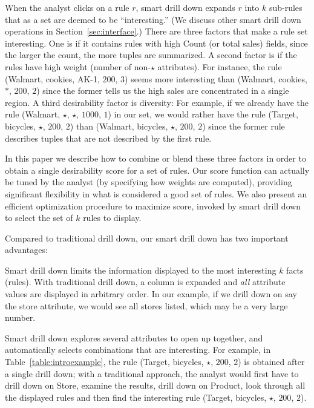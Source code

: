 \begin{example}
When the analyst clicks on a rule $r$, smart drill down
expands $r$ into $k$ sub-rules that as a set are deemed to be ``interesting.''
(We discuss other smart drill down operations in Section~\ref{sec:interface}.)
There are three factors that make a rule set interesting.
One is if it contains rules with high Count (or total sales) fields,
since the larger the count, the more tuples are summarized.
A second factor is if the rules have high weight (number of non-$\star$ attributes).
For instance, the rule (Walmart, cookies, AK-1, $200$, $3$)
seems more interesting than (Walmart, cookies, $*$, $200$, $2$)
since the former tells us the high sales are concentrated in a single region.
A third desirability factor is diversity:
For example, if we already have the rule (Walmart, $\star$, $\star$, $1000$, $1$)
in our set, we would rather have the rule (Target, bicycles, $\star$, $200$, $2$)
than (Walmart, bicycles, $\star$, $200$, $2$) since the former rule
describes tuples that are not described by the first rule.
\end{example}

In this paper we describe how to combine or blend these three factors
in order to obtain a single desirability score for a set of rules.
Our score function can actually be tuned by the analyst
(by specifying how weights are computed),
providing significant flexibility in what is considered a good set of rules.
We also present an efficient optimization procedure to maximize score, invoked
by smart drill down to select the set of $k$ rules to display.


 Compared to traditional drill down, our smart drill down has two important advantages:
\squishlist
\item
Smart drill down limits the information displayed
to the most interesting $k$ facts (rules).
With traditional drill down, a column is expanded and {\em all}
attribute values are displayed in arbitrary order.
In our example, if we drill down on say the store attribute,
we would see all stores listed, which may be a very large number.
\item
Smart drill down explores several attributes to open up together,
and automatically selects combinations that are interesting.
For example, in Table~\ref{table:introexample},
the rule (Target, bicycles, $\star$, $200$, $2$)
is obtained after a single drill down;
with a traditional approach, the analyst would first have to drill down on
Store, examine the results, drill down on Product,
look through all the displayed rules and then find the interesting rule
(Target, bicycles, $\star$, $200$, $2$).
\squishend

